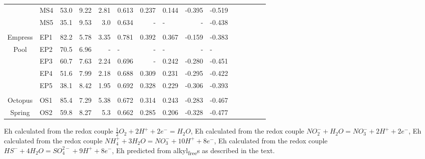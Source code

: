 {\begin{landscape}
\begin{table}
\begin{adjustbox}{width=\textheight,keepaspectratio}
\begin{threeparttable}
\begin{tabular}{clrrrererererer}
      & MS4   & 53.0  & 9.22  & 2.81  & 0.613 & 0.237 & 0.144 & -0.395 & -0.519 \\
      & MS5   & 35.1  & 9.53  & 3.0   & 0.634 & -     & -     & -     & -0.438 \\
      &       &       &       &       &       &       &       &       &  \\
Empress & EP1   & 82.2  & 5.78  & 3.35  & 0.781 & 0.392 & 0.367 & -0.159 & -0.383 \\
Pool  & EP2   & 70.5  & 6.96  & -     & -     & -     & -     & -     & - \\
      & EP3   & 60.7  & 7.63  & 2.24  & 0.696 & -     & 0.242 & -0.280 & -0.451 \\
      & EP4   & 51.6  & 7.99  & 2.18  & 0.688 & 0.309 & 0.231 & -0.295 & -0.422 \\
      & EP5   & 38.1  & 8.42  & 1.95  & 0.692 & 0.328 & 0.229 & -0.306 & -0.393 \\
      &       &       &       &       &       &       &       &       &  \\
Octopus & OS1   & 85.4  & 7.29  & 5.38  & 0.672 & 0.314 & 0.243 & -0.283 & -0.467 \\
Spring & OS2   & 59.8  & 8.27  & 5.3   & 0.662 & 0.285 & 0.206 & -0.328 & -0.477 \\
\bottomrule
\end{tabular}%

  
  \begin{tablenotes}
     Eh calculated from the redox couple $\frac{1}{2}O_{2} + 2H^{+} + 2e^{-} = H_{2}O$,
     Eh calculated from the redox couple $NO_{2}^{-} + H_{2}O = NO_{3}^{-}+ 2H^{+} + 2e^{-}$,
     Eh calculated from the redox couple $NH_{4}^{+} + 3H_{2}O = NO_{3}^{-}+ 10H^{+} + 8e^{-}$,
     Eh calculated from the redox couple $HS^{-} + 4H_{2}O = SO_{4}^{2-}+ 9H^{+} + 8e^{-}$,
     Eh predicted from alkyl\textsubscript{free}s as described in the text.
    \item%
        
  \end{tablenotes}
  
  \label{tab:eh_results}
  \end{threeparttable}
  \end{adjustbox}
\end{table}

\setcounter{tabcounter}{0} %
\doublespace
\end{landscape}
\clearpage
}


